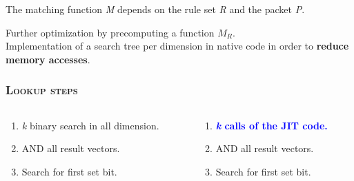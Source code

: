 \documentclass[xcolor=x11names,compress]{beamer}
\renewcommand{\(}{\begin{columns}}
\renewcommand{\)}{\end{columns}}
\newcommand{\<}[1]{\begin{column}{#1}}
\renewcommand{\>}{\end{column}}
\begin{document}
\begin{frame}
  \begin{tcolorbox}[colback=teal!5!white,colframe=teal!75!black,title=Reminder,drop fuzzy shadow]
  The matching function \textit{M} depends on the rule set \textit{R} and the packet \textit{P}.
  \end{tcolorbox}
  \pause
  \begin{tcolorbox}[colback=blue!5!white,colframe=blue!75!black,title=Idea,drop fuzzy shadow]
  Further optimization by precomputing a function $M_R$.\\
  Implementation of a search tree per dimension in native code in order to \textbf{reduce memory accesses}.
  \end{tcolorbox}
\end{frame}

\begin{frame}
  \frametitle{\scshape Lookup steps}
  \begin{columns}[T] %
    \begin{column}{.48\textwidth}
    \begin{tcolorbox}[colback=red!5!white,colframe=red!75!black,title=Standard bitvector,drop fuzzy shadow]
    \begin{enumerate}[label=\arabic*)]%
      \item \textit{k} binary search in all dimension.
      \item AND all result vectors.
      \item Search for first set bit.
    \end{enumerate}
    \end{tcolorbox}
    \end{column}
    \hfill
    \begin{column}{.48\textwidth}
    \begin{tcolorbox}[colback=blue!5!white,colframe=blue!75!black,title=Bitvector with JIT,drop fuzzy shadow]
    \begin{enumerate}[label=\arabic*)]%
      \item \textcolor{blue}{\textbf{\textit{k} calls of the JIT code.}}
      \item AND all result vectors.
      \item Search for first set bit.
    \end{enumerate}
    \end{tcolorbox}
    \end{column}
  \end{columns}
\end{frame}
\end{document}
